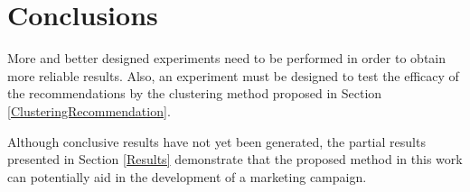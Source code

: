\documentclass{acm_proc_article-sp}
\begin{document}
\section{Conclusions}

More and better designed experiments need to be performed in order to
obtain more reliable results. Also, an experiment must be designed to
test the efficacy of the recommendations by the clustering method
proposed in Section \ref{ClusteringRecommendation}.

Although conclusive results have not yet been generated, the partial
results presented in Section \ref{Results} demonstrate that the
proposed method in this work can potentially aid in the development of
a marketing campaign.




\balancecolumns
\end{document}

